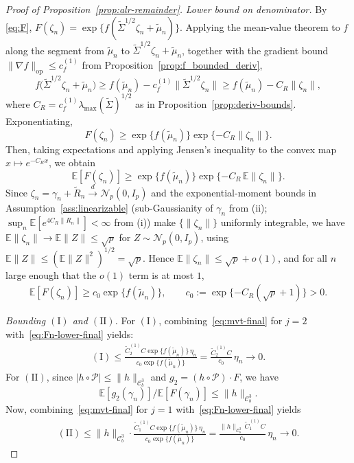 \documentclass[12pt]{article}
\newcommand{\op}{\mathrm{op}}
\newcommand{\Ee}{{\mathbb{E}}}
\newcommand{\cP}{{\mathcal{P}}}
\begin{document}
\begin{appendices}
\begin{proof}[Proof of Proposition~\ref{prop:alr-remainder}]
\medskip\noindent\textit{Lower bound on denominator.}
By \eqref{eq:F}, $F(\zeta_n)=\exp\{f(\widetilde\Sigma^{1/2}\zeta_n+\widetilde\mu_n)\}$.
Applying the mean-value theorem to $f$ along the segment from $\widetilde\mu_n$ to $\widetilde\Sigma^{1/2}\zeta_n+\widetilde\mu_n$, together with the gradient bound $\|\nabla f\|_{\op}\le c_f^{(1)}$ from Proposition~\ref{prop:f_bounded_deriv},
\[
f\big(\widetilde\Sigma^{1/2}\zeta_n+\widetilde\mu_n\big)
\ge f(\widetilde\mu_n)-c_f^{(1)}\big\|\widetilde\Sigma^{1/2}\zeta_n\big\|
\ge f(\widetilde\mu_n)-C_R\|\zeta_n\|,
\]
where $C_R=c_f^{(1)}\lambda_{\max}(\widetilde\Sigma)^{1/2}$ as in Proposition~\ref{prop:deriv-bounds}. Exponentiating,
\[
F(\zeta_n)\ge\exp\{f(\widetilde\mu_n)\}\exp\{-C_R\|\zeta_n\|\}.
\]Then, taking expectations and applying Jensen's inequality to the convex map $x\mapsto e^{-C_R x}$, we obtain
$$
\Ee[F(\zeta_n)]
  \ge\exp\{f(\widetilde\mu_n)\}\exp\{-C_R\,\Ee\|\zeta_n\|\}.
$$
Since $\zeta_n=\gamma_n+\widetilde R_n\xrightarrow{d}\mathcal N_p(0,I_p)$ and the exponential-moment bounds in Assumption~\ref{ass:linearizable} (sub-Gaussianity of $\gamma_n$ from (ii); $\sup_n\Ee[e^{4C_R\|R_n\|}]<\infty$ from (i)) make $\{\|\zeta_n\|\}$ uniformly integrable, we have $\Ee\|\zeta_n\|\to\Ee\|Z\|\le\sqrt p$ for $Z\sim\mathcal N_p(0,I_p)$, using $\Ee\|Z\|\le(\Ee\|Z\|^2)^{1/2}=\sqrt p$. Hence $\Ee\|\zeta_n\|\le\sqrt p+o(1)$, and for all $n$ large enough that the $o(1)$ term is at most $1$,
\begin{align}
  \label{eq:Fn-lower-final}
  \Ee[F(\zeta_n)]\ge c_0\exp\{f(\widetilde\mu_n)\},
  \qquad c_0:=\exp\{-C_R(\sqrt p+1)\}>0.
\end{align}

\medskip\noindent\textit{Bounding $(\mathrm I)$ and $(\mathrm{II})$.}
For $(\mathrm I)$, combining~\eqref{eq:mvt-final} for $j=2$
with~\eqref{eq:Fn-lower-final} yields:
\begin{align*}
  (\mathrm I)
  \le\frac{\widetilde C_2^{(1)}C\exp\{f(\widetilde\mu_n)\}\,\eta_n}
          {c_0\exp\{f(\widetilde\mu_n)\}}
  =\frac{\widetilde C_2^{(1)}C}{c_0}\,\eta_n\to0.
\end{align*}
For $(\mathrm{II})$, since $|h\circ\cP|\le\|h\|_{\mathcal C^3_b}$ and
$g_2=(h\circ\cP) \cdot F$, we have
$$\Ee[g_2(\gamma_n)]/\Ee[F(\gamma_n)]\le\|h\|_{\mathcal C^3_b}.$$
Now, combining~\eqref{eq:mvt-final} for $j=1$ with~\eqref{eq:Fn-lower-final} yields
\begin{align*}
  (\mathrm{II})
  \le\|h\|_{\mathcal C^3_b}\cdot
     \frac{\widetilde C_1^{(1)}C\exp\{f(\widetilde\mu_n)\}\,\eta_n}
          {c_0\exp\{f(\widetilde\mu_n)\}}
  =\frac{\|h\|_{\mathcal C^3_b}\,\widetilde C_1^{(1)}C}{c_0}\,\eta_n\to0.
\end{align*}
\end{proof}


\end{appendices}
\end{document}
